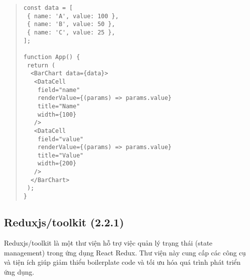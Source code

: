 \begin{quote}
\begin{lstlisting}
const data = [
 { name: 'A', value: 100 },
 { name: 'B', value: 50 },
 { name: 'C', value: 25 },
];

function App() {
 return (
  <BarChart data={data}>
   <DataCell
    field="name"
    renderValue={(params) => params.value}
    title="Name"
    width={100}
   />
   <DataCell
    field="value"
    renderValue={(params) => params.value}
    title="Value"
    width={200}
   />
  </BarChart>
 );
}
\end{lstlisting}
\end{quote}

\subsection{Reduxjs/toolkit (2.2.1)}

Reduxjs/toolkit là một thư viện hỗ trợ việc quản lý trạng thái (state management) trong ứng dụng React Redux. Thư viện này cung cấp các công cụ và tiện ích giúp giảm thiểu boilerplate code và tối ưu hóa quá trình phát triển ứng dụng.

